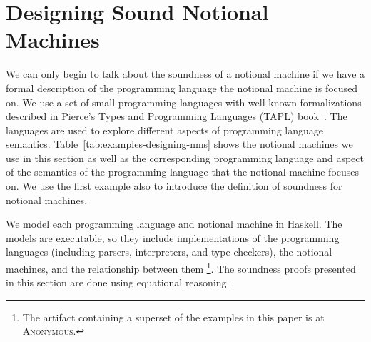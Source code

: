 \section{Designing Sound Notional Machines}
\label{chr:Modeling}


We can only begin to talk about the soundness of a notional machine if we have a
formal description of the programming language the notional machine is focused
on.
%
We use a set of small programming languages with well-known formalizations
described in
Pierce's Types and Programming Languages (TAPL) book~\citep{pierceTypesProgrammingLanguages2002}.
The languages are used to
explore different aspects of programming language semantics.
%
%
Table~\ref{tab:examples-designing-nms}
shows
the notional machines
we use in this section
as well as
the corresponding programming language
and aspect of the semantics of the programming language
that the notional machine focuses on.
%
We use the first example also to introduce the definition of soundness for notional machines.

We model each programming language and notional machine in Haskell.
The models are executable,
so they include implementations of the programming languages
(including parsers, interpreters, and type-checkers),
the notional machines,
and the relationship between them%
\footnote{%
The artifact containing a superset of the examples in this paper
is at
\textsc{Anonymous}.
}.
The soundness proofs presented in this section are done using equational reasoning~\citep{gibbonsCalculatingFunctionalPrograms2002,birdAlgebraicIdentitiesProgram1989}.

